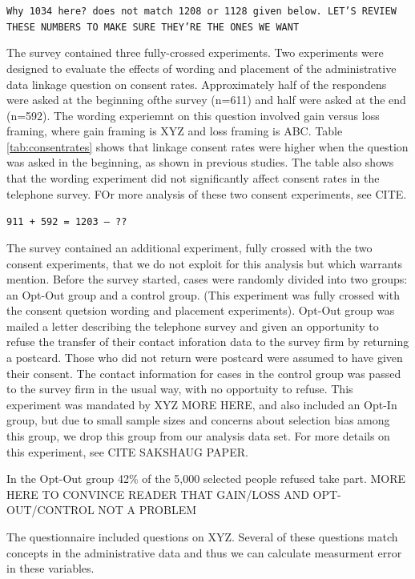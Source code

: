 \texttt{Why 1034 here? does not match 1208 or 1128 given below. LET'S REVIEW THESE NUMBERS TO MAKE SURE THEY'RE THE ONES WE WANT}

The survey contained three fully-crossed experiments. Two experiments were designed to evaluate the effects of wording and placement of the administrative data linkage question on consent rates. Approximately half of the respondens were asked at the beginning ofthe survey (n=611) and half were asked at the end (n=592). The wording experiemnt on this question involved gain versus loss framing, where gain framing is XYZ and loss framing is ABC. Table \ref{tab:consentrates} shows that linkage consent rates were higher when the question was asked in the beginning, as shown in previous studies. The table also shows that the wording experiment did not significantly affect consent rates in the telephone survey. FOr more analysis of these two consent experiments, see CITE.

\texttt{911 + 592 = 1203 -- ??}



The survey contained an additional experiment, fully crossed with the two consent experiments, that we do not exploit for this analysis but which warrants mention. Before the survey started, cases were randomly divided into two groups: an Opt-Out group and a control group. (This experiment was fully crossed with the consent quetsion wording and placement experiments). Opt-Out group was mailed a letter describing the telephone survey and given an opportunity to refuse the transfer of their contact inforation data to the survey firm by returning a postcard. Those who did not return were postcard were assumed to have given their consent. The contact information for cases in the control group was passed to the survey firm in the usual way, with no opportuity to refuse. This experiment was mandated by XYZ MORE HERE, and also included an Opt-In group, but due to small sample sizes and concerns about selection bias among this group, we drop this group from  our analysis data set. For more details on this experiment, see CITE SAKSHAUG PAPER. 

In the Opt-Out group 42\% of the 5,000 selected people refused take part. MORE HERE TO CONVINCE READER THAT GAIN/LOSS AND OPT-OUT/CONTROL NOT A PROBLEM

The questionnaire included questions on XYZ. Several of these questions match concepts in the administrative data and thus we can calculate measurment error in these variables.

